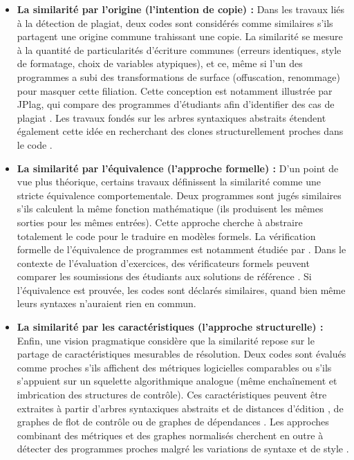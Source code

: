\documentclass[12pt,a4paper,oneside]{report}
\begin{document}
\begin{itemize}
    \item \textbf{La similarité par l'origine (l'intention de copie) :} Dans
     les travaux  liés à la détection de plagiat, deux codes sont considérés 
     comme similaires s'ils partagent une origine commune trahissant une copie. 
     La similarité se mesure à la quantité de particularités d'écriture communes (erreurs identiques, style de formatage, choix de variables atypiques), et ce, même si l'un des programmes a subi des transformations de surface (offuscation, renommage) pour masquer cette filiation. Cette conception est notamment illustrée par JPlag, qui compare des programmes d'étudiants afin d'identifier des cas de plagiat \cite{prechelt_finding_nodate}. Les travaux fondés sur les arbres syntaxiques abstraits étendent également cette idée en recherchant des clones structurellement proches dans le code \cite{baxter_clone_1998}.
    
    \item \textbf{La similarité par l'équivalence (l'approche formelle) :} D'un
     point de vue plus théorique, certains travaux définissent la similarité 
     comme une stricte équivalence comportementale. Deux programmes sont jugés
      similaires s'ils calculent la même fonction mathématique (ils produisent 
      les mêmes sorties pour les mêmes entrées). Cette approche cherche à abstraire totalement le code pour le traduire en modèles formels. La vérification formelle de l'équivalence de programmes est notamment étudiée par \cite{milovancevic_automated_nodate}. Dans le contexte de l'évaluation d'exercices, des vérificateurs formels peuvent comparer les soumissions des étudiants aux solutions de référence \cite{vafeiadis_formal_2025}. Si l'équivalence est prouvée, les codes sont déclarés similaires, quand bien même leurs syntaxes n'auraient rien en commun.
    
    \item \textbf{La similarité par les caractéristiques (l'approche structurelle) :} Enfin, une vision pragmatique considère que la similarité repose sur le partage de caractéristiques mesurables de résolution. Deux codes sont évalués comme proches s'ils affichent des métriques logicielles comparables ou s'ils s'appuient sur un squelette algorithmique analogue (même enchaînement et imbrication des structures de contrôle). Ces caractéristiques peuvent être extraites à partir d'arbres syntaxiques abstraits et de distances d'édition \cite{baxter_clone_1998,zhang_simple_1989,song_revisiting_2024}, de graphes de flot de contrôle \cite{vujosevic-janicic_software_2013} ou de graphes de dépendances \cite{xiang_graph_2024,reddy_graph-based_2025}. Les approches combinant des métriques et des graphes normalisés cherchent en outre à détecter des programmes proches malgré les variations de syntaxe et de style \cite{wang_detection_2014,lu_cssg_2026}.
\end{itemize}
\end{document}
